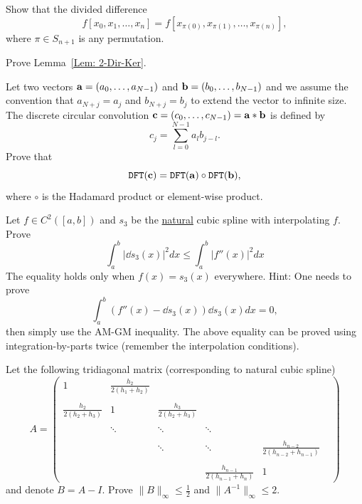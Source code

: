 \begin{problem}
    Show that the divided difference $$f[x_0, x_1,\dots, x_n] = f[x_{\pi(0)}, x_{\pi(1)},\dots, x_{\pi(n)}],$$ where $\pi\in S_{n+1}$ is any permutation.
\end{problem}
\begin{problem}
\label{Prb: 2-Theo-6}
    Prove Lemma~\ref{Lem: 2-Dir-Ker}.
\end{problem}
\begin{problem}
    Let two vectors $\mathbf a = (a_0,\dots, a_{N-1})$ and $\mathbf b = (b_0, \dots, b_{N-1})$ and we assume the convention that $a_{N + j} = a_j$ and $b_{N+j} = b_j$ to extend the vector to infinite size. The discrete circular convolution $\mathbf c = (c_0,\dots, c_{N-1}) = \mathbf a\ast \mathbf b$ is defined by 
$$c_j = \sum_{l = 0}^{N-1} a_l b_{j - l}.$$
Prove that 
$$\textup{\texttt{DFT}}(\mathbf c) = \textup{\texttt{DFT}}(\mathbf a)\circ \textup{\texttt{DFT}}(\mathbf b),$$
where $\circ$ is the Hadamard product or element-wise product.
\end{problem}
\begin{problem} Let $f\in C^2([a, b])$ and $s_3$ be the \underline{natural} cubic spline with interpolating $f$. Prove 
    \begin{equation}
        \int_a^b |\dd{s_3}(x)|^2 dx \le \int_{a}^b |f''(x)|^2 dx 
    \end{equation}
    The equality holds only when $f(x) = s_3(x)$ everywhere.
    Hint: One needs to prove 
    \begin{equation}
        \int_a^b (f''(x) - \dd{s_3}(x)) \dd{s_3}(x) dx = 0,
    \end{equation}
    then simply use the AM-GM inequality. The above equality can be proved using integration-by-parts twice (remember the interpolation conditions).
\end{problem}
\begin{problem}
    Let the following tridiagonal matrix (corresponding to natural cubic spline)
    $$A = \begin{pmatrix}
        1 & \frac{h_{2}}{2(h_1 + h_{2})} & \\\\
        \frac{h_2}{2(h_2 + h_{3})} & 1 & \frac{h_{3}}{2(h_2 + h_{3})} & \\\\
        &\ddots &\ddots &  \ddots & \\ \\
        &&\ddots &\ddots &  \frac{h_{n-2}}{2(h_{n-2} + h_{n-1})} & \\ \\
        &&& \frac{h_{n-1}}{2(h_{n-1} + h_{n})} & 1&
    \end{pmatrix} $$
    and denote $B = A - I$. Prove $\|B\|_{\infty} \le \frac{1}{2}$ and $\|A^{-1}\|_{\infty}\le 2$. 
\end{problem}
